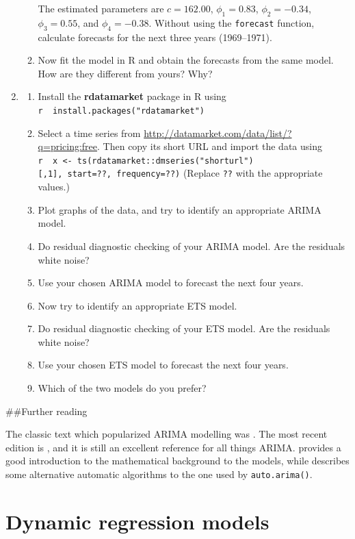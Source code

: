 \documentclass[]{book}
\providecommand{\tightlist}{%
  \setlength{\itemsep}{0pt}\setlength{\parskip}{0pt}}
\begin{document}
\begin{enumerate}
\begin{enumerate}
    The estimated parameters are
    \(c = 162.00\),
    \(\phi_1 = 0.83\),
    \(\phi_2 = -0.34\),
    \(\phi_3 = 0.55\), and
    \(\phi_4 = -0.38\).
    Without using the \texttt{forecast} function, calculate forecasts for the next three years (1969--1971).
  \item
    Now fit the model in R and obtain the forecasts from the same model. How are they different from yours? Why?
  \end{enumerate}
\item
  \begin{enumerate}
  \def\labelenumii{\alph{enumii}.}
  \tightlist
  \item
    Install the \textbf{rdatamarket} package in R using
    \texttt{r\ \ install.packages("rdatamarket")}
  \item
    Select a time series from \url{http://datamarket.com/data/list/?q=pricing:free}. Then copy its short URL and import the data using
    \texttt{r\ \ x\ \textless{}-\ ts(rdatamarket::dmseries("shorturl"){[},1{]},\ start=??,\ frequency=??)}
    (Replace \texttt{??} with the appropriate values.)
  \item
    Plot graphs of the data, and try to identify an appropriate ARIMA model.
  \item
    Do residual diagnostic checking of your ARIMA model. Are the residuals white noise?
  \item
    Use your chosen ARIMA model to forecast the next four years.
  \item
    Now try to identify an appropriate ETS model.
  \item
    Do residual diagnostic checking of your ETS model. Are the residuals white noise?
  \item
    Use your chosen ETS model to forecast the next four years.
  \item
    Which of the two models do you prefer?
  \end{enumerate}
\end{enumerate}

\#\#Further reading

The classic text which popularized ARIMA modelling was \citet{BJ70}. The most recent edition is \citet{BJRL15}, and it is still an excellent reference for all things ARIMA. \citet{BDbook16} provides a good introduction to the mathematical background to the models, while \citet{PTT01} describes some alternative automatic algorithms to the one used by \texttt{auto.arima()}.

\hypertarget{ch-dynamic}{%
\chapter{Dynamic regression models}\label{ch-dynamic}}
\end{document}
